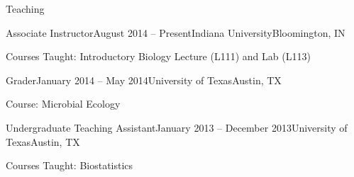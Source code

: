 \documentclass{resume} %
\begin{document}
\begin{rSection}{Teaching}

\begin{rSubsection}{Associate Instructor}{August 2014 -- Present}{Indiana University}{Bloomington, IN}
\item Courses Taught: Introductory Biology Lecture (L111) and Lab (L113)
\end{rSubsection}

\begin{rSubsection}{Grader}{January 2014 -- May 2014}{University of Texas}{Austin, TX}
\item Course: Microbial Ecology
\end{rSubsection}

\begin{rSubsection}{Undergraduate Teaching Assistant}{January 2013 -- December 2013}{University of Texas}{Austin, TX}
\item Courses Taught: Biostatistics
\end{rSubsection}

\end{rSection}
\end{document}
